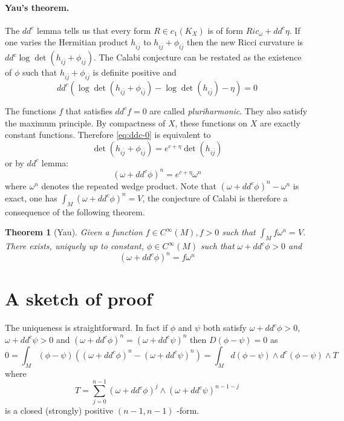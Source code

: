 \documentclass[11pt]{article}
\newtheorem{theorem}{Theorem}
\begin{document}
\paragraph{Yau's theorem.}
\label{sec:org8751b70}
The \(dd^c\) lemma tells us that every form \(R\in c_1(K_X)\) is of form \(Ric_{\omega} + dd^c\eta\). If one
varies the Hermitian product \(h_{i\bar j}\) to \(h_{i\bar j} + \phi_{i\bar j}\) then the new Ricci
curvature is \(dd^c\log\det(h_{i\bar j} + \phi_{i\bar j})\). The Calabi conjecture can be restated as
the existence of \(\phi\) such that \(h_{i\bar j} + \phi_{i\bar j}\) is definite positive and
\begin{equation}
\label{eq:ddc-0}
dd^c\left( \log\det(h_{i\bar j} + \phi_{i\bar j}) - \log\det(h_{i\bar j}) -\eta\right) = 0
\end{equation}

The functions \(f\) that satisfies \(dd^cf = 0\) are called \emph{pluriharmonic}. They also satisfy the
maximum principle. By compactness of \(X\), these functions on \(X\) are exactly constant
functions. Therefore \eqref{eq:ddc-0} is equivalent to
\[
\det(h_{i\bar j} + \phi_{i\bar j}) = e^{c+\eta}\det(h_{i \bar j})
\]
or by \(dd^c\) lemma:
\[
(\omega + dd^c\phi)^n = e^{c+\eta}\omega^n
\]
where \(\omega^n\) denotes the repeated wedge product. Note that \((\omega +dd^c\phi)^n - \omega^n\) is exact,
one has \(\int_M (\omega +dd^c\phi)^n = V\), the conjecture of Calabi is therefore a consequence of
the following theorem.

\begin{theorem}[Yau]
Given a function \(f\in C^\infty(M), f>0\) such that \(\int_M f\omega^n = V\). There exists, uniquely
up to constant, \(\phi\in C^\infty(M)\) such that \(\omega + dd^c\phi >0\) and
\[
(\omega + dd^c\phi)^n = f\omega^n
\]
\end{theorem}

\section{A sketch of proof}
\label{sec:orgbeccb48}
The uniqueness is straightforward. In fact if \(\phi\) and \(\psi\)
both satisfy \(\omega + dd^c\phi >0\), \(\omega + dd^c \psi >0\) and \((\omega + dd^c\phi)^n = (\omega +
dd^c\psi)^n\) then \(D(\phi - \psi) = 0\) as \[ 0 = \int_M (\phi - \psi)((\omega + dd^c\phi)^n -
(\omega + dd^c\psi)^n) = \int_M d(\phi -\psi)\wedge d^c (\phi -\psi) \wedge T \] where 
\[ 
T =\sum_{j=0}^{n-1}(\omega + dd^c\phi)^j\wedge (\omega + dd^c\psi)^{n-1-j} 
\] 
is a closed (strongly)
positive \((n-1,n-1)\) -form.
\end{document}
